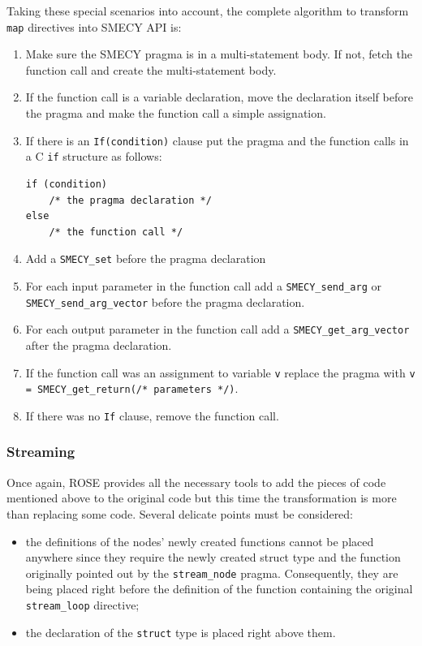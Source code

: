 \documentclass[a4paper]{article}
\begin{document}
	Taking these special scenarios into account, the complete algorithm to transform \verb+map+ directives into SMECY API is:
	\begin{enumerate}
		\item Make sure the SMECY pragma is in a multi-statement body. If not, fetch the function call and create the multi-statement body.
		\item If the function call is a variable declaration, move the declaration itself before the pragma and make the function call a simple assignation.
		\item If there is an \verb+If(condition)+ clause put the pragma and the function calls in a C \verb+if+ structure as follows:
		\begin{lstlisting}[frame=none, numbers=none]
if (condition)
	/* the pragma declaration */
else
	/* the function call */
		\end{lstlisting}
		\item Add a \verb+SMECY_set+ before the pragma declaration
		\item For each input parameter in the function call add a \verb+SMECY_send_arg+ or \verb+SMECY_send_arg_vector+ before the pragma declaration.
		\item For each output parameter in the function call add a \verb+SMECY_get_arg_vector+ after the pragma declaration.
		\item If the function call was an assignment to variable \verb+v+ replace the pragma with \verb+v = SMECY_get_return(/* parameters */)+.
		\item If there was no \verb+If+ clause, remove the function call.
	\end{enumerate}

	\subsubsection{Streaming} Once again, ROSE provides all the necessary tools to add the pieces of code mentioned above to the original code but this time the transformation is more than replacing some code. Several delicate points must be considered:
	\begin{itemize}
		\item the definitions of the nodes' newly created functions cannot be placed anywhere since they require the newly created struct type and the function originally pointed out by the \verb+stream_node+ pragma. Consequently, they are being placed right before the definition of the function containing the original \verb+stream_loop+ directive;
        \item the declaration of the \texttt{struct} type is placed right above them.
	\end{itemize}
	
\end{document}
